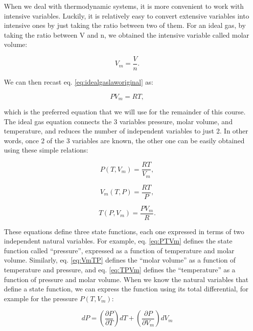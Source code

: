 \documentclass[
]{book}
\theoremstyle{definition}
\theoremstyle{definition}
\theoremstyle{definition}
\theoremstyle{remark}
\begin{document}
When we deal with thermodynamic systems, it is more convenient to work with intensive variables. Luckily, it is relatively easy to convert extensive variables into intensive ones by just taking the ratio between two of them. For an ideal gas, by taking the ratio between V and n, we obtained the intensive variable called molar volume:

\begin{equation}
  V_m=\frac{V}{n}.   
  \label{eq:Vmdef}
\end{equation}

We can then recast eq. \eqref{eq:idealgaslaworiginal} as:

\begin{equation}
  PV_m=RT,
  \label{eq:idealgaslaw}
\end{equation}

which is the preferred equation that we will use for the remainder of this course.
The ideal gas equation connects the 3 variables pressure, molar volume, and temperature, and reduces the number of independent variables to just 2. In other words, once 2 of the 3 variables are known, the other one can be easily obtained using these simple relations:

\begin{equation}
  P(T,V_m)=\frac{RT}{V_m},
  \label{eq:PTVm}
\end{equation}

\begin{equation}
  V_m(T,P)=\frac{RT}{P},
  \label{eq:VmTP}
 \end{equation}

\begin{equation}
  T(P,V_m)=\frac{PV_m}{R}.
  \label{eq:TPVm}
\end{equation}

These equations define three state functions, each one expressed in terms of two independent natural variables. For example, eq. \eqref{eq:PTVm} defines the state function called ``pressure'', expressed as a function of temperature and molar volume. Similarly, eq. \eqref{eq:VmTP} defines the ``molar volume'' as a function of temperature and pressure, and eq. \eqref{eq:TPVm} defines the ``temperature'' as a function of pressure and molar volume. When we know the natural variables that define a state function, we can express the function using its total differential, for example for the pressure \(P(T, V_m)\):

\begin{equation}
  dP=\left( \frac{\partial P}{\partial T} \right)dT + \left( \frac{\partial P}{\partial V_m} \right)dV_m
  \label{eq:totaldifferentialP}
\end{equation}
\end{document}
